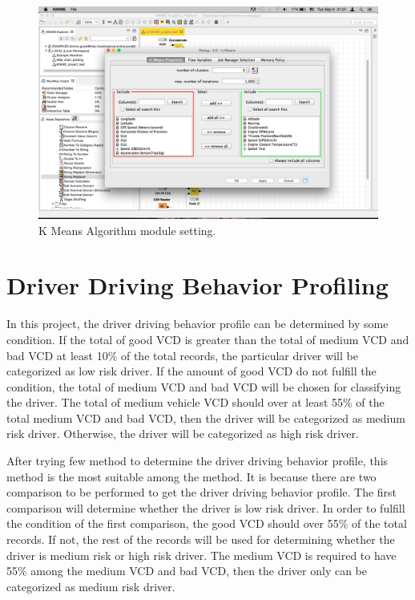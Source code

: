\begin{figure}[hbt!]\centering
\includegraphics[width=.75\textwidth]{image/KNIMEkmean}
\caption{K Means Algorithm module setting.}
\label{fig:kmean}
\end{figure}



\section{Driver Driving Behavior Profiling}
In this project, the driver driving behavior profile can be determined by some condition. %
If the total of good VCD is greater than the total of medium VCD and bad VCD at least 10\% of the total records, the particular driver will be categorized as low risk driver. If the amount of good VCD do not fulfill the condition, the total of medium VCD and bad VCD will be chosen for classifying the driver. The total of medium vehicle VCD should over at least 55\% of the total medium VCD and bad VCD, then the driver will be categorized as medium risk driver. Otherwise, the driver will be categorized as high risk driver.

After trying few method to determine the driver driving behavior profile, this method is the most suitable among the method. It is because there are two comparison to be performed to get the driver driving behavior profile. The first comparison will determine whether the driver is low risk driver. In order to fulfill the condition of the first comparison, the good VCD should over 55\% of the total records. If not, the rest of the records will be used for determining whether the driver is medium risk or high risk driver. The medium VCD is required to have 55\% among the medium VCD and bad VCD, then the driver only can be categorized as medium risk driver.

